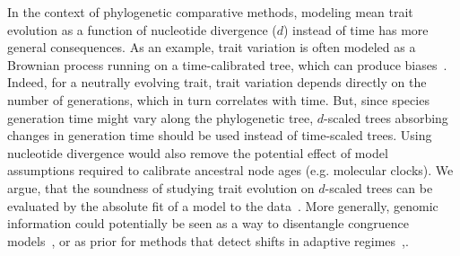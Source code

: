 \documentclass{article}
\begin{document}
In the context of phylogenetic comparative methods, modeling mean trait evolution as a function of nucleotide divergence ($d$) instead of time has more general consequences.
As an example, trait variation is often modeled as a Brownian process running on a time-calibrated tree, which can produce biases~\citep{litsios_effects_2012}.
Indeed, for a neutrally evolving trait, trait variation depends directly on the number of generations, which in turn correlates with time. But, since species generation time might vary along the phylogenetic tree, $d$-scaled trees absorbing changes in generation time should be used instead of time-scaled trees.
Using nucleotide divergence would also remove the potential effect of model assumptions required to calibrate ancestral node ages (e.g. molecular clocks).
We argue, that the soundness of studying trait evolution on $d$-scaled trees can be evaluated by the absolute fit of a model to the data~\citep{pennell_model_2015}.
More generally, genomic information could potentially be seen as a way to disentangle congruence models~\citep{louca_extant_2020}, or as prior for methods that detect shifts in adaptive regimes~\citep{ingram_surface_2013, uyeda_novel_2014, khabbazian_fast_2016, mitov_fast_2020},.
\end{document}
